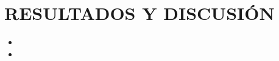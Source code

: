 \chapter{RESULTADOS Y DISCUSIÓN}
\thispagestyle{empty}
\begin{itemize}
    \item \lipsum[2]
    \item \lipsum[3]
\end{itemize}


